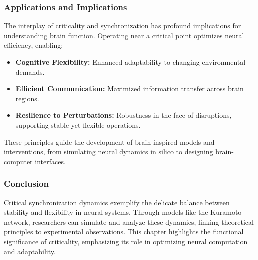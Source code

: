\subsubsection*{Applications and Implications}

The interplay of criticality and synchronization has profound implications for understanding brain function. Operating near a critical point optimizes neural efficiency, enabling: 
\begin{itemize}
    \item \textbf{Cognitive Flexibility:} Enhanced adaptability to changing environmental demands.
    \item \textbf{Efficient Communication:} Maximized information transfer across brain regions.
    \item \textbf{Resilience to Perturbations:} Robustness in the face of disruptions, supporting stable yet flexible operations.
\end{itemize}

These principles guide the development of brain-inspired models and interventions, from simulating neural dynamics in silico to designing brain-computer interfaces.

\subsubsection*{Conclusion}

Critical synchronization dynamics exemplify the delicate balance between stability and flexibility in neural systems. Through models like the Kuramoto network, researchers can simulate and analyze these dynamics, linking theoretical principles to experimental observations. This chapter highlights the functional significance of criticality, emphasizing its role in optimizing neural computation and adaptability.
